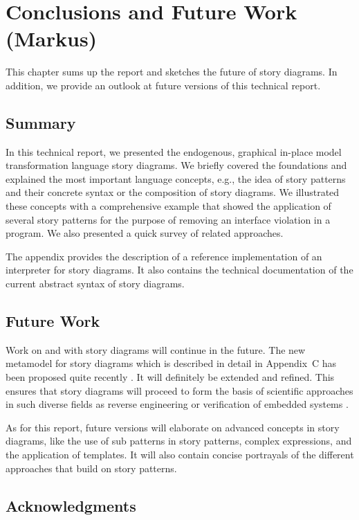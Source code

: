 \chapter{Conclusions and Future Work (Markus)}

This chapter sums up the report and sketches the future of story diagrams. In addition, we provide an outlook at future versions of this technical report.

\section{Summary}

In this technical report, we presented the endogenous, graphical in-place model transformation language story diagrams. We briefly covered the foundations and explained the most important language concepts, e.g., the idea of story patterns and their concrete syntax or the composition of story diagrams. We illustrated these concepts with a comprehensive example that showed the application of several story patterns for the purpose of removing an interface violation in a program. We also presented a quick survey of related approaches.

The appendix provides the description of a reference implementation of an interpreter for story diagrams. It also contains the technical documentation of the current abstract syntax of story diagrams.

\section{Future Work}

Work on and with story diagrams will continue in the future. The new metamodel for story diagrams which is described in detail in Appendix~C has been proposed quite recently \cite{HRvD+11}. It will definitely be extended and refined. This ensures that story diagrams will proceed to form the basis of scientific approaches in such diverse fields as reverse engineering \cite{DMT10} or verification of embedded systems \cite{HSE10}.

As for this report, future versions will elaborate on advanced concepts in story diagrams, like the use of sub patterns in story patterns, complex expressions, and the application of templates. It will also contain concise portrayals of the different approaches that build on story patterns.

\section*{Acknowledgments}

